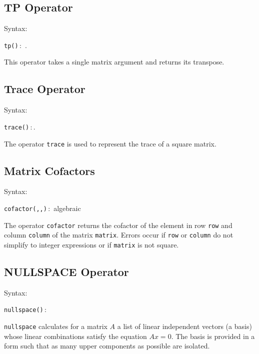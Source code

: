 \subsection{TP Operator}
\hypertarget{operator:TP}{}
Syntax:
\begin{syntax}
        \texttt{tp(}\texttt{)}\,:\, .
\end{syntax}

This operator takes a single matrix argument and returns its transpose.

\subsection{Trace Operator}
\hypertarget{operator:TRACE}{}
Syntax:
\begin{syntax}
        \texttt{trace(}\texttt{)}\,:\,.
\end{syntax}
The operator \texttt{trace} is used to represent the trace of a square matrix.

\subsection{Matrix Cofactors}
\hypertarget{operator:COFACTOR}{}
Syntax:
\begin{syntax}
  \texttt{cofactor(}\texttt{,}\texttt{,}\texttt{)}\,:\,
           algebraic
\end{syntax}

The operator \texttt{cofactor} returns the cofactor of the element in row
\texttt{row} and column \texttt{column} of the matrix \texttt{matrix}.  Errors occur
if \texttt{row} or \texttt{column} do not simplify to integer expressions or if
\texttt{matrix} is not square.

\subsection{NULLSPACE Operator}
\hypertarget{operator:NULLSPACE}{}
Syntax:
\begin{syntax}
        \texttt{nullspace(}\texttt{)}\,:\,
\end{syntax}
\texttt{nullspace} calculates for a matrix $A$ a list of linear
independent vectors (a basis) whose linear combinations satisfy the
equation $A x = 0$.  The basis is provided in a form such that as many
upper components as possible are isolated.

